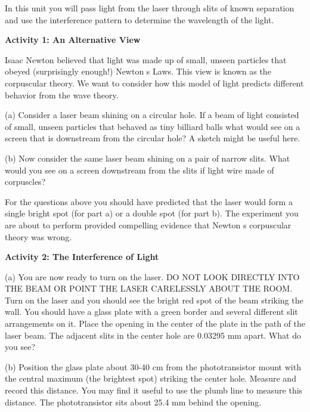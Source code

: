 In this unit you will pass light from the laser through slits of known
separation and use the interference pattern to determine the wavelength
of the light.

\textbf{Activity 1: An Alternative View}

Isaac Newton believed that light was made up of small, unseen particles
that obeyed (surprisingly enough!) Newton s Laws. This view is known
as the corpuscular theory. We want to consider how this model of light
predicts different behavior from the wave theory.

\vspace{35mm}
(a) Consider a laser beam shining on a circular hole. If a beam of
light consisted of small, unseen particles that behaved as tiny billiard
balls what would see on a screen that is downstream from the circular
hole? A sketch might be useful here.
\vspace{1.5in}

(b) Now consider the same laser beam shining on a pair of narrow slits.
What would you see on a screen downstream from the slits if light
wire made of corpuscles?
\vspace{30mm}

For the questions above you should have predicted that the laser would
form a single bright spot (for part a) or a double spot (for part
b). The experiment you are about to perform provided compelling evidence
that Newton s corpuscular theory was wrong. 

\textbf{Activity 2: The Interference of Light }

(a) You are now ready to turn on the laser. DO NOT LOOK DIRECTLY INTO
THE BEAM OR POINT THE LASER CARELESSLY ABOUT THE ROOM. Turn on the
laser and you should see the bright red spot of the beam striking
the wall. You should have a glass plate with a green border and several
different slit arrangements on it. Place the opening in the center
of the plate in the path of the laser beam. The adjacent slits in
the center hole are 0.03295 mm apart. What do you see? 
\vspace{15mm}

(b) Position the glass plate about 30-40 cm from the phototransistor
mount with the central maximum (the brightest spot) 
striking the center hole. Measure and record this
distance. You may find it useful to use the plumb line to measure
this distance.
The phototransistor sits about 25.4 mm behind the opening.
\vspace{15mm}

